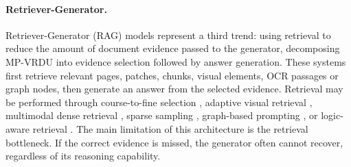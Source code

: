 \documentclass[11pt]{article}
\begin{document}

\paragraph{Retriever-Generator.}
Retriever-Generator (RAG) models represent a third trend: using retrieval to reduce the amount of document evidence passed to the generator, decomposing MP-VRDU into evidence selection followed by answer generation. These systems first retrieve relevant pages, patches, chunks, visual elements, OCR passages or graph nodes, then generate an answer from the selected evidence. Retrieval may be performed through course-to-fine selection \cite{zhang2024cream}, adaptive visual retrieval \cite{li2025avir}, multimodal dense retrieval \cite{cho2024m3docrag, tanaka2025vdocrag}, sparse sampling \cite{xie2024wukong}, graph-based prompting \cite{wang2024knowledge}, or logic-aware retrieval \cite{wu2025molorag}. The main limitation of this architecture is the retrieval bottleneck. If the correct evidence is missed, the generator often cannot recover, regardless of its reasoning capability. 
\end{document}
